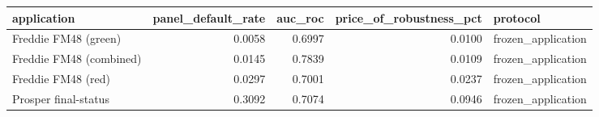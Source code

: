 \begin{tabular}{lrrrl}
\toprule
application & panel\_default\_rate & auc\_roc & price\_of\_robustness\_pct & protocol \\
\midrule
Freddie FM48 (green) & 0.0058 & 0.6997 & 0.0100 & frozen\_application \\
Freddie FM48 (combined) & 0.0145 & 0.7839 & 0.0109 & frozen\_application \\
Freddie FM48 (red) & 0.0297 & 0.7001 & 0.0237 & frozen\_application \\
Prosper final-status & 0.3092 & 0.7074 & 0.0946 & frozen\_application \\
\bottomrule
\end{tabular}
